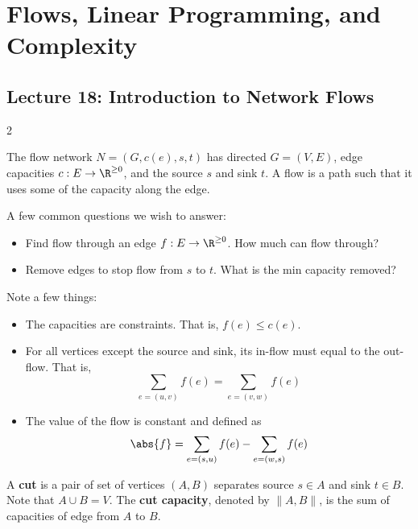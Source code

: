 \pagebreak
\section{Flows, Linear Programming, and Complexity}

\subsection{Lecture 18: Introduction to Network Flows}

\begin{multicols}{2}
\begin{definition}
The flow network $N = (G, c(e), s,t)$ has directed $G = (V, E)$, edge capacities $c: E \to \R^{\geq 0}$, and the source $s$ and sink $t$. A flow is a path such that it uses some of the capacity along the edge. 
\end{definition}

A few common questions we wish to answer: 
\begin{itemize}
    \item Find flow through an edge $f : E \to \R^{\geq 0}$. How much can flow through? 
    \item Remove edges to stop flow from $s$ to $t$. What is the min capacity removed? 
\end{itemize}
Note a few things: 
\begin{itemize}
    \item The capacities are constraints. That is, $f(e) \leq c(e)$. 
    \item For all vertices except the source and sink, its in-flow must equal to the out-flow. That is, $$\sum_{e = (u, v)} f(e) = \sum_{e = (v,w)} f(e)$$
    \item The value of the flow is constant and defined as 
    $$
    \abs{f} = \sum_{e = (s,u)}f(e) - \sum_{e = (w,s)}f(e)
    $$
\end{itemize}

\begin{definition}
    A \textbf{cut} is a pair of set of vertices $(A, B)$ separates source $s \in A$ and sink $t \in B$. Note that $A \cup B = V$. The \textbf{cut capacity}, denoted by $\|A,B\|$, is the sum of capacities of edge from $A$ to $B$. 
\end{definition}


\end{multicols}

